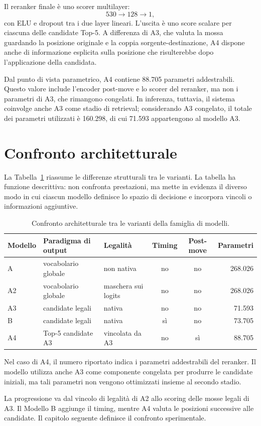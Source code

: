Il reranker finale \`e uno scorer multilayer:
\[
    530 \rightarrow 128 \rightarrow 1,
\]
con ELU e dropout tra i due layer lineari. L'uscita \`e uno score scalare per ciascuna delle candidate Top-5. A differenza di A3, che valuta la mossa guardando la posizione originale e la coppia sorgente-destinazione, A4 dispone anche di informazione esplicita sulla posizione che risulterebbe dopo l'applicazione della candidata.

Dal punto di vista parametrico, A4 contiene 88.705 parametri addestrabili. Questo valore include l'encoder post-move e lo scorer del reranker, ma non i parametri di A3, che rimangono congelati. In inferenza, tuttavia, il sistema coinvolge anche A3 come stadio di retrieval; considerando A3 congelato, il totale dei parametri utilizzati \`e 160.298, di cui 71.593 appartengono al modello A3.

\section{Confronto architetturale}

La Tabella~\ref{tab:model-architecture-comparison} riassume le differenze strutturali tra le varianti. La tabella ha funzione descrittiva: non confronta prestazioni, ma mette in evidenza il diverso modo in cui ciascun modello definisce lo spazio di decisione e incorpora vincoli o informazioni aggiuntive.

\begin{table}[htbp]
    \centering
    \small
    \begin{tabularx}{\textwidth}{l>{\raggedright\arraybackslash}X>{\raggedright\arraybackslash}p{}ccr}
        \hline
        Modello & Paradigma di output & Legalit\`a & Timing & Post-move & Parametri \\
        \hline
        A & vocabolario globale & non nativa & no & no & 268.026 \\
        A2 & vocabolario globale & maschera sui logits & no & no & 268.026 \\
        A3 & candidate legali & nativa & no & no & 71.593 \\
        B & candidate legali & nativa & s\`i & no & 73.705 \\
        A4 & Top-5 candidate A3 & vincolata da A3 & no & s\`i & 88.705 \\
        \hline
    \end{tabularx}
    \caption{Confronto architetturale tra le varianti della famiglia di modelli.}
    \label{tab:model-architecture-comparison}
\end{table}

Nel caso di A4, il numero riportato indica i parametri addestrabili del reranker. Il modello utilizza anche A3 come componente congelata per produrre le candidate iniziali, ma tali parametri non vengono ottimizzati insieme al secondo stadio.

La progressione va dal vincolo di legalit\`a di A2 allo scoring delle mosse legali di A3. Il Modello B aggiunge il timing, mentre A4 valuta le posizioni successive alle candidate. Il capitolo seguente definisce il confronto sperimentale.
